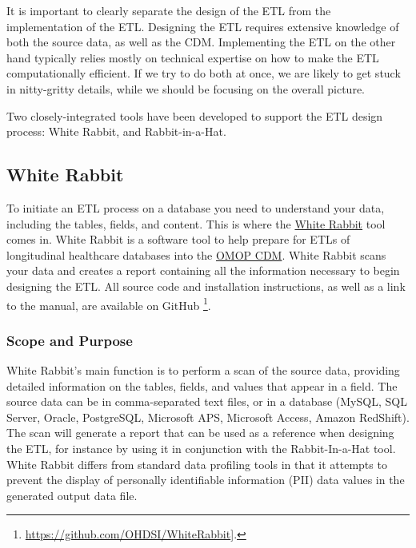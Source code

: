 \documentclass[11pt]{book}
\let\rmarkdownfootnote\footnote%
\def\footnote{\protect\rmarkdownfootnote}
\theoremstyle{definition}
\theoremstyle{definition}
\theoremstyle{definition}
\theoremstyle{remark}
\begin{document}
It is important to clearly separate the design of the ETL from the implementation of the ETL. Designing the ETL requires extensive knowledge of both the source data, as well as the CDM. Implementing the ETL on the other hand typically relies mostly on technical expertise on how to make the ETL computationally efficient. If we try to do both at once, we are likely to get stuck in nitty-gritty details, while we should be focusing on the overall picture.

Two closely-integrated tools have been developed to support the ETL design process: White Rabbit, and Rabbit-in-a-Hat.

\hypertarget{white-rabbit}{%
\subsection{White Rabbit}\label{white-rabbit}}

To initiate an ETL process on a database you need to understand your data, including the tables, fields, and content. This is where the \href{https://github.com/OHDSI/WhiteRabbit}{White Rabbit} tool comes in. White Rabbit is a software tool to help prepare for ETLs of longitudinal healthcare databases into the \href{https://github.com/OHDSI/CommonDataModel}{OMOP CDM}. White Rabbit scans your data and creates a report containing all the information necessary to begin designing the ETL. All source code and installation instructions, as well as a link to the manual, are available on GitHub \footnote{\url{https://github.com/OHDSI/WhiteRabbit}{]}.}.  

\hypertarget{scope-and-purpose}{%
\subsubsection*{Scope and Purpose}\label{scope-and-purpose}}

White Rabbit's main function is to perform a scan of the source data, providing detailed information on the tables, fields, and values that appear in a field. The source data can be in comma-separated text files, or in a database (MySQL, SQL Server, Oracle, PostgreSQL, Microsoft APS, Microsoft Access, Amazon RedShift). The scan will generate a report that can be used as a reference when designing the ETL, for instance by using it in conjunction with the Rabbit-In-a-Hat tool. White Rabbit differs from standard data profiling tools in that it attempts to prevent the display of personally identifiable information (PII) data values in the generated output data file.
\end{document}
